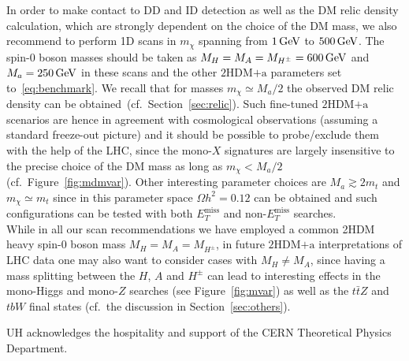 \documentclass[a4paper, 11pt,notoc]{article}
\newcommand{\MET}{\ensuremath{E_T^\mathrm{miss}}\xspace}
\newcommand{\mA}{\ensuremath{M_{A}}\xspace}
\newcommand{\ma}{\ensuremath{M_{a}}\xspace}
\newcommand{\mH}{\ensuremath{M_{H}}\xspace}
\newcommand{\mHc}{\ensuremath{M_{H^{\pm}}}\xspace}
\newcommand{\hdma}{\ensuremath{\textrm{2HDM+a}}\xspace}
\begin{document}
In order to make contact to DD and ID detection as well as the DM relic density calculation, which are strongly dependent on the choice of the DM mass, we also recommend to perform 1D scans in $m_\chi$ spanning from $1\, {\rm GeV}$ to $500 \, {\rm GeV}$. The  spin-0 boson masses should be taken as $\mH = \mA = \mHc = 600 \, {\rm GeV}$ and $\ma = 250 \, {\rm GeV}$  in these scans and the other \hdma parameters set to~\eqref{eq:benchmark}. We recall that for masses $m_\chi \simeq \ma/2$ the observed DM relic density can be obtained~(cf.~Section~\ref{sec:relic}). Such fine-tuned \hdma scenarios are hence in agreement with cosmological observations (assuming a standard freeze-out picture) and  it should be possible to probe/exclude them with the help of the LHC, since the mono-$X$ signatures are largely insensitive to the precise choice of the DM mass as long as $m_\chi < \ma/2$  (cf.~Figure~\ref{fig:mdmvar}). Other interesting parameter choices are $M_a \gtrsim 2 m_t$ and $m_\chi \simeq m_t$  since in this parameter space $\Omega h^2 = 0.12$ can be obtained and such configurations can be tested with both $\MET$ and non-$\MET$ searches. \\[2mm]

\noindent While in all our scan recommendations we have employed a common 2HDM heavy  spin-0 boson  mass $\mH = \mA = \mHc$, in future \hdma interpretations of LHC data one may also want to consider cases with $M_H \neq M_A$, since having a mass splitting between the $H$, $A$ and $H^\pm$ can lead to interesting effects in the mono-Higgs and mono-$Z$ searches (see Figure~\ref{fig:mvar}) as well as the $t \bar t Z$ and $tbW$ final states (cf.~the discussion in Section~\ref{sec:others}).  


\acknowledgments 

UH acknowledges the hospitality  and support of the CERN Theoretical Physics Department.



\end{document}
